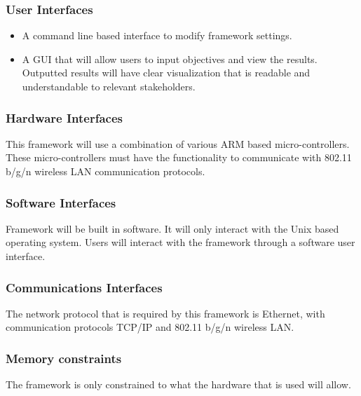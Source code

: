 \documentclass[draftclsnofoot, onecolumn, compsoc, 10pt]{IEEEtran}
\begin{document}
\subsubsection{User Interfaces}
\begin{itemize}
\item A command line based interface to modify framework settings.\\
\item A GUI that will allow users to input objectives and view the results. Outputted results will have clear visualization that is readable and understandable to relevant stakeholders. 
\end{itemize}

\subsubsection{Hardware Interfaces}
This framework will use a combination of various ARM based micro-controllers. These micro-controllers must have the functionality to communicate with 802.11 b/g/n wireless LAN communication protocols.

\subsubsection{Software Interfaces}
Framework will be built in software. It will only interact with the Unix based operating system. Users will interact with the framework through a software user interface.

\subsubsection{Communications Interfaces}
The network protocol that is required by this framework is Ethernet, with communication protocols TCP/IP and 802.11 b/g/n wireless LAN.

\subsubsection{Memory constraints}
The framework is only constrained to what the hardware that is used will allow.
 
\end{document}
